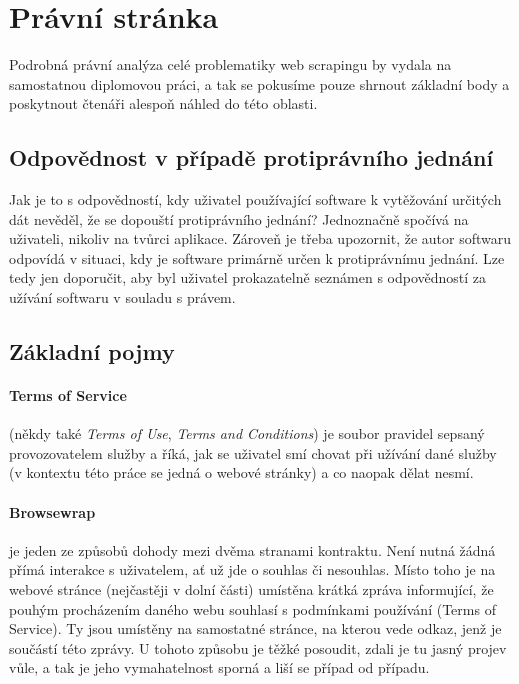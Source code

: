 \documentclass[thesis=B,czech]{FITthesis}[2012/06/26]
\begin{document}
\section{Právní stránka}
Podrobná právní analýza celé problematiky web scrapingu by vydala na samostatnou diplomovou práci, a tak se pokusíme pouze shrnout základní body a poskytnout čtenáři alespoň náhled do této oblasti.

\subsection{Odpovědnost v případě protiprávního jednání}
Jak je to s odpovědností, kdy uživatel používající software k vytěžování určitých dát nevěděl, že se dopouští protiprávního jednání? Jednoznačně spočívá na uživateli, nikoliv na tvůrci aplikace. Zároveň je třeba upozornit, že autor softwaru odpovídá v situaci, kdy je software primárně určen k protiprávnímu jednání. Lze tedy jen doporučit, aby byl uživatel prokazatelně seznámen s odpovědností za užívání softwaru v souladu s právem.\cite{rozhovor}

\subsection{Základní pojmy}
\paragraph{Terms of Service} (někdy také \textit{Terms of Use}, \textit{Terms and Conditions}) je soubor pravidel sepsaný provozovatelem služby a říká, jak se uživatel smí chovat při užívání dané služby (v kontextu této práce se jedná o webové stránky) a co naopak dělat nesmí.

\paragraph{Browsewrap} je jeden ze způsobů dohody mezi dvěma stranami kontraktu. Není nutná žádná přímá interakce s uživatelem, ať už jde o souhlas či nesouhlas. Místo toho je na webové stránce (nejčastěji v dolní části) umístěna krátká zpráva informující, že pouhým procházením daného webu souhlasí s podmínkami používání (Terms of Service). Ty jsou umístěny na samostatné stránce, na kterou vede odkaz, jenž je součástí této zprávy. U tohoto způsobu je těžké posoudit, zdali je tu jasný projev vůle, a tak je jeho vymahatelnost sporná a liší se případ od případu.\cite{browse_wrap}
\end{document}
